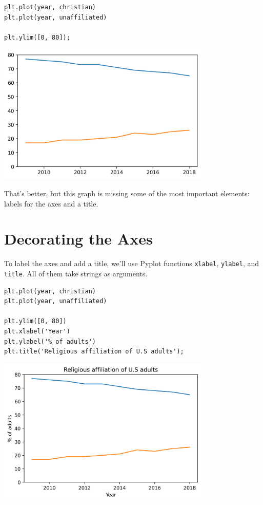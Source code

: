 \begin{lstlisting}[]
plt.plot(year, christian)
plt.plot(year, unaffiliated)

plt.ylim([0, 80]);
\end{lstlisting}

\begin{center}
\includegraphics[width=4in]{chapters/06_plotting_files/06_plotting_26_0.png}
\end{center}

That's better, but this graph is missing some of the most important
elements: labels for the axes and a title.

\hypertarget{decorating-the-axes}{%
\section{Decorating the Axes}\label{decorating-the-axes}}

To label the axes and add a title, we'll use Pyplot functions
\passthrough{\lstinline!xlabel!}, \passthrough{\lstinline!ylabel!}, and
\passthrough{\lstinline!title!}. All of them take strings as arguments.

\begin{lstlisting}[]
plt.plot(year, christian)
plt.plot(year, unaffiliated)

plt.ylim([0, 80])
plt.xlabel('Year')
plt.ylabel('% of adults')
plt.title('Religious affiliation of U.S adults');
\end{lstlisting}

\begin{center}
\includegraphics[width=4in]{chapters/06_plotting_files/06_plotting_29_0.png}
\end{center}

